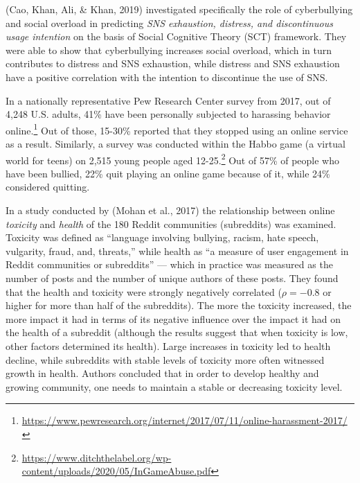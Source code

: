 \documentclass[10pt,dvipsnames]{scrartcl}
\begin{document}
(Cao, Khan, Ali, \& Khan, 2019) investigated specifically the role of
cyberbullying and social overload in predicting
\textit{SNS exhaustion, distress, and discontinuous usage intention} on
the basis of Social Cognitive Theory (SCT) framework. They were able to
show that cyberbullying increases social overload, which in turn
contributes to distress and SNS exhaustion, while distress and SNS
exhaustion have a positive correlation with the intention to discontinue
the use of SNS.

In a nationally representative Pew Research Center survey from 2017, out
of 4,248 U.S. adults, 41\% have been personally subjected to harassing
behavior
online.\footnote{\url{https://www.pewresearch.org/internet/2017/07/11/online-harassment-2017/}}
Out of those, 15-30\% reported that they stopped using an online service
as a result. Similarly, a survey was conducted within the Habbo game (a
virtual world for teens) on 2,515 young people aged
12-25.\footnote{\url{https://www.ditchthelabel.org/wp-content/uploads/2020/05/InGameAbuse.pdf}}
Out of 57\% of people who have been bullied, 22\% quit playing an online
game because of it, while 24\% considered quitting.

In a study conducted by (Mohan et al., 2017) the relationship between
online \emph{toxicity} and \emph{health} of the 180 Reddit communities
(subreddits) was examined. Toxicity was defined as ``language involving
bullying, racism, hate speech, vulgarity, fraud, and, threats,'' while
health as ``a measure of user engagement in Reddit communities or
subreddits'' --- which in practice was measured as the number of posts
and the number of unique authors of these posts. They found that the
health and toxicity were strongly negatively correlated (\(\rho=-0.8\)
or higher for more than half of the subreddits). The more the toxicity
increased, the more impact it had in terms of its negative influence
over the impact it had on the health of a subreddit (although the
results suggest that when toxicity is low, other factors determined its
health). Large increases in toxicity led to health decline, while
subreddits with stable levels of toxicity more often witnessed growth in
health. Authors concluded that in order to develop healthy and growing
community, one needs to maintain a stable or decreasing toxicity level.
\end{document}
